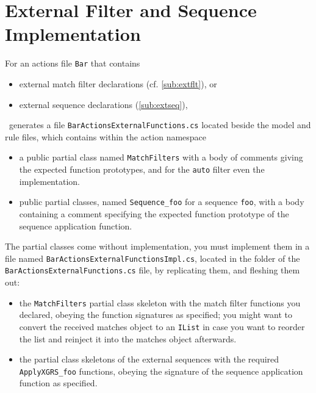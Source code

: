 

\section{External Filter and Sequence Implementation}\label{sub:extfltseqimpl}

For an actions file \texttt{Bar} that contains
\begin{itemize}
	\item external match filter declarations (cf. \ref{sub:extflt}), or
	\item external sequence declarations (\ref{sub:extseq}),
\end{itemize}
\GrG~generates a file \texttt{BarActionsExternalFunctions.cs} located beside the model and rule files, which contains within the action namespace 
\begin{itemize}
	\item a public partial class named \texttt{MatchFilters} with a body of comments giving the expected function prototypes, and for the \texttt{auto} filter even the implementation.
	\item public partial classes, named \texttt{Sequence\_foo} for a sequence \texttt{foo}, with a body containing a comment specifying the expected function prototype of the sequence application function.
\end{itemize}

\noindent The partial classes come without implementation, you must implement them in a file named \texttt{Bar\-Actions\-External\-FunctionsImpl.cs}, located in the folder of the \texttt{Bar\-Actions\-External\-Functions.cs} file, by replicating them, and fleshing them out:
\begin{itemize}
	\item the \texttt{MatchFilters} partial class skeleton with the match filter functions you declared, obeying the function signatures as specified; you might want to convert the received matches object to an \texttt{IList} in case you want to reorder the list and reinject it into the matches object afterwards.
	\item the partial class skeletons of the external sequences with the required \texttt{ApplyXGRS\_foo} functions, obeying the signature of the sequence application function as specified.
\end{itemize}

